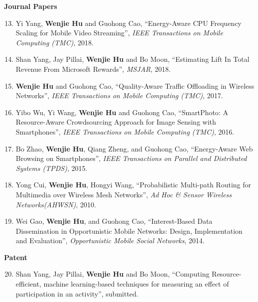 \documentclass[margin,line]{res}
\begin{document}
\begin{resume}
{\bf Journal Papers}
\vspace*{.05in}
\begin{enumerate} [leftmargin=5mm]%
\setcounter{enumi}{12}
\item  Yi Yang, {\bf Wenjie Hu} and Guohong Cao, ``Energy-Aware CPU Frequency Scaling for Mobile Video Streaming'', {\em IEEE Transactions on Mobile Computing (TMC)}, 2018.
\item Shan Yang, Jay Pillai, {\bf Wenjie Hu} and Bo Moon, ``Estimating Lift In Total Revenue From Microsoft Rewards'', {\em MSJAR}, 2018.
\item {\bf Wenjie Hu} and Guohong Cao, ``Quality-Aware Traffic Offloading in Wireless Networks'', {\em IEEE Transactions on Mobile Computing (TMC)}, 2017.
\item Yibo Wu, Yi Wang, {\bf Wenjie Hu} and Guohong Cao, ``SmartPhoto: A Resource-Aware Crowdsourcing Approach for Image Sensing with Smartphones'', {\em IEEE Transactions on Mobile Computing (TMC)}, 2016. %
\item Bo Zhao, {\bf Wenjie Hu}, Qiang Zheng, and Guohong Cao, ``Energy-Aware Web Browsing on Smartphones'', {\em IEEE Transactions on Parallel and Distributed Systems (TPDS)}, 2015. %
\item Yong Cui, {\bf Wenjie Hu}, Hongyi Wang, ``Probabilistic Multi-path Routing for Multimedia over Wireless Mesh Networks'', {\em Ad Hoc \& Sensor Wireless Networks(AHWSN)}, 2010.
\item Wei Gao, {\bf Wenjie Hu}, and Guohong Cao, ``Interest-Based Data Dissemination in Opportunistic Mobile Networks: Design, Implementation and Evaluation'', {\em Opportunistic Mobile Social Networks}, 2014. %
\end{enumerate}

{\bf Patent}
\vspace*{.05in}
\begin{enumerate} [leftmargin=7mm]%
\setcounter{enumi}{19}
\item Shan Yang, Jay Pillai, {\bf Wenjie Hu} and Bo Moon, ``Computing Resource-efficient, machine learning-based techniques for measuring an effect of participation in an activity'', submitted.
\end{enumerate}

%




\end{resume}
\end{document}
